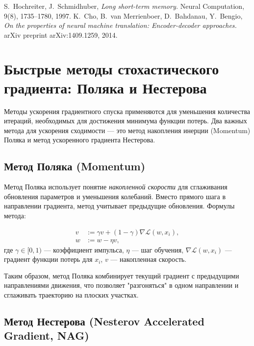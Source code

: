 \begin{thebibliography}{99}
	 S.~Hochreiter, J.~Schmidhuber, \textit{Long short-term memory.} Neural Computation, 9(8), 1735--1780, 1997.
	 K.~Cho, B.~van Merrienboer, D.~Bahdanau, Y.~Bengio, \textit{On the properties of neural machine translation: Encoder-decoder approaches.} arXiv preprint arXiv:1409.1259, 2014.
\end{thebibliography}

\section*{Быстрые методы стохастического градиента: Поляка и Нестерова}

Методы ускорения градиентного спуска применяются для уменьшения количества итераций, необходимых для достижения минимума функции потерь. Два важных метода для ускорения сходимости — это метод накопления инерции (Momentum) Поляка и метод ускоренного градиента Нестерова.


\subsection*{Метод Поляка (Momentum)}

Метод Поляка использует понятие \textit{накопленной скорости} для сглаживания обновления параметров и уменьшения колебаний. Вместо прямого шага в направлении градиента, метод учитывает предыдущие обновления. Формулы метода:

\begin{equation*}
	\begin{aligned}
		v & := \gamma v + (1 - \gamma) \nabla \mathcal{L}(w, x_i), \\
		w & := w - \eta v,
	\end{aligned}
\end{equation*}
где $\gamma \in [0, 1)$ — коэффициент импульса, $\eta$ — шаг обучения, $\nabla \mathcal{L}(w, x_i)$ — градиент функции потерь для $x_i$, $v$ — накопленная скорость.

Таким образом, метод Поляка комбинирует текущий градиент с предыдущими направлениями движения, что позволяет "разгоняться" в одном направлении и сглаживать траекторию на плоских участках.

\subsection*{Метод Нестерова (Nesterov Accelerated Gradient, NAG)}

